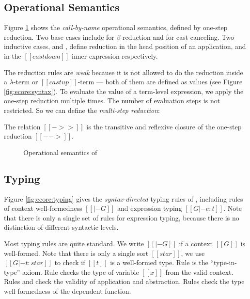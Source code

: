 \subsection{Operational Semantics}\label{sec:ecore:opsem}

Figure \ref{fig:ecore:opsem} shows the \emph{call-by-name} operational
semantics, defined by one-step reduction. Two base cases include
 for $\beta$-reduction and 
for cast canceling. Two inductive cases,  and
, define reduction in the head position of an
application, and in the $[[castdown]]$ inner expression
respectively.

The reduction rules are \emph{weak} because it is
not allowed to do the reduction inside a $\lambda$-term or $[[castup]]$-term --- 
both of them are defined as values (see Figure \ref{fig:ecore:syntax}).
To evaluate the value of a term-level expression, we apply the
one-step reduction multiple times. The number of evaluation steps is
not restricted. So we can define the \emph{multi-step reduction}:

\begin{dfn}
    The relation $[[->>]]$ is the transitive and reflexive closure of
    the one-step reduction $[[-->]]$.
\end{dfn}

\begin{figure}
    \ottdefnstep{}
    \caption{Operational semantics of \ecore}
    \label{fig:ecore:opsem}
\end{figure}

\subsection{Typing}\label{sec:ecore:type}

Figure \ref{fig:ecore:typing} gives the \emph{syntax-directed} typing
rules of \ecore, including rules of context well-formedness $[[|- G]]$
and expression typing $[[G |- e : t]]$. Note that there is only a
single set of rules for expression typing, because there is no
distinction of different syntactic levels.

Most typing rules are quite standard. We write $[[|- G]]$ if a context
$[[G]]$ is well-formed. Note that there is only a single sort
$[[star]]$, we use $[[G |- t : star]]$ to check if $[[t]]$ is a
well-formed type. Rule  is the ``type-in-type''
axiom. Rule  checks the type of variable $[[x]]$ from
the valid context. Rules  and  check
the validity of application and abstraction. Rules 
check the type well-formedness of the dependent function.

